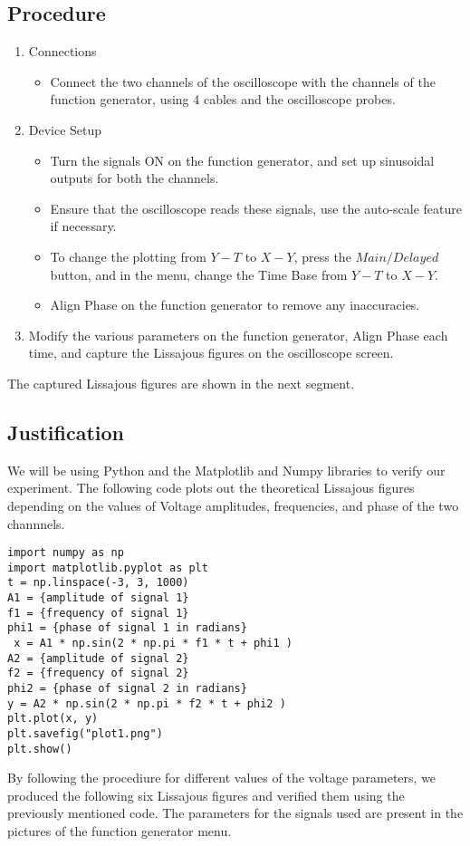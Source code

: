 \documentclass[a4paper,12pt]{article}
\begin{document}
\subsection{Procedure}
\begin{enumerate}
\item Connections
\begin{itemize}
\item Connect the two channels of the oscilloscope with the channels of the function generator, using 4 cables and the oscilloscope probes.
\end{itemize}
\item Device Setup
\begin{itemize}
\item Turn the signals ON on the function generator, and set up sinusoidal outputs for both the channels.
\item Ensure that the oscilloscope reads these signals, use the auto-scale feature if necessary.
\item To change the plotting from $Y-T$ to $X-Y$, press the $Main/Delayed$ button, and in the menu, change the Time Base from $Y-T$ to $X-Y$.
\item Align Phase on the function generator to remove any inaccuracies.
\end{itemize}
\item Modify the various parameters on the function generator, Align Phase each time, and capture the Lissajous figures on the oscilloscope screen.
\end{enumerate}
The captured Lissajous figures are shown in the next segment.
\subsection{Justification}
We will be using Python and the Matplotlib and Numpy libraries to verify our experiment. The following code plots out the theoretical Lissajous figures depending on the values of Voltage amplitudes, frequencies, and phase of the two channnels.
\begin{verbatim}
import numpy as np
import matplotlib.pyplot as plt
t = np.linspace(-3, 3, 1000)
A1 = {amplitude of signal 1}
f1 = {frequency of signal 1}
phi1 = {phase of signal 1 in radians}
 x = A1 * np.sin(2 * np.pi * f1 * t + phi1 )
A2 = {amplitude of signal 2}
f2 = {frequency of signal 2}
phi2 = {phase of signal 2 in radians}
y = A2 * np.sin(2 * np.pi * f2 * t + phi2 )
plt.plot(x, y)
plt.savefig("plot1.png")
plt.show()
\end{verbatim}
By following the procediure for different values of the voltage parameters, we produced the following six Lissajous figures and verified them using the previously mentioned code.
The parameters for the signals used are present in the pictures of the function generator menu.
\end{document}
